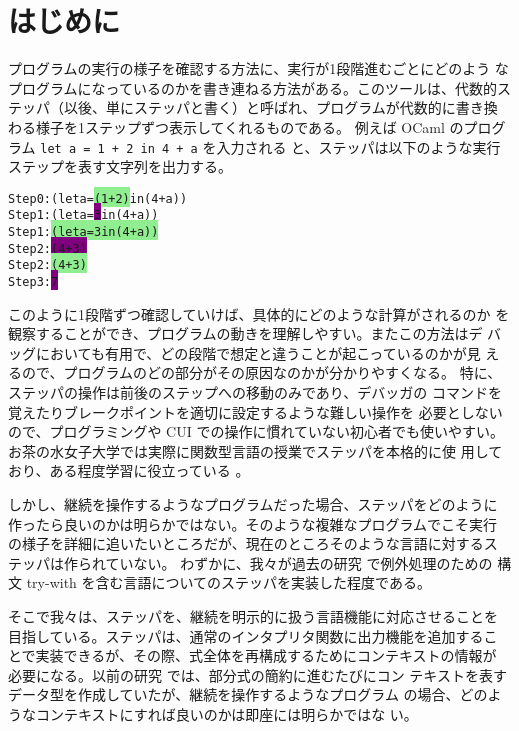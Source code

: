 \section{はじめに}

プログラムの実行の様子を確認する方法に、実行が1段階進むごとにどのよう
なプログラムになっているのかを書き連ねる方法がある。このツールは、代数的ス
テッパ（以後、単にステッパと書く）と呼ばれ、プログラムが代数的に書き換
わる様子を1ステップずつ表示してくれるものである。
例えば OCaml のプログラム \texttt{let a = 1 + 2 in 4 + a} を入力される
と、ステッパは以下のような実行ステップを表す文字列を出力する。

\vspace{-5pt}
\begin{spacing}{0.9}
\begin{alltt}
Step 0:  (let a = \colorbox{lightgreen}{(1 + 2)} in (4 + a))
Step 1:  (let a = \colorbox{purple}{3} in (4 + a))
Step 1:  \colorbox{lightgreen}{(let a = 3 in (4 + a))}
Step 2:  \colorbox{purple}{(4 + 3)}
Step 2:  \colorbox{lightgreen}{(4 + 3)}
Step 3:  \colorbox{purple}{7}
\end{alltt}
\end{spacing}
\vspace{-5pt}

このように1段階ずつ確認していけば、具体的にどのような計算がされるのか
を観察することができ、プログラムの動きを理解しやすい。またこの方法はデ
バッグにおいても有用で、どの段階で想定と違うことが起こっているのかが見
えるので、プログラムのどの部分がその原因なのかが分かりやすくなる。
特に、ステッパの操作は前後のステップへの移動のみであり、デバッガの
コマンドを覚えたりブレークポイントを適切に設定するような難しい操作を
必要としないので、プログラミングや CUI での操作に慣れていない初心者でも使いやすい。
お茶の水女子大学では実際に関数型言語の授業でステッパを本格的に使
用しており、ある程度学習に役立っている \cite{FCA19}。

しかし、継続を操作するようなプログラムだった場合、ステッパをどのように
作ったら良いのかは明らかではない。そのような複雑なプログラムでこそ実行
の様子を詳細に追いたいところだが、現在のところそのような言語に対するス
テッパは作られていない。
わずかに、我々が過去の研究 \cite{FCA19} で例外処理のための
構文 try-with を含む言語についてのステッパを実装した程度である。

そこで我々は、ステッパを、継続を明示的に扱う言語機能に対応させることを
目指している。ステッパは、通常のインタプリタ関数に出力機能を追加するこ
とで実装できるが、その際、式全体を再構成するためにコンテキストの情報が
必要になる。以前の研究 \cite{FCA19} では、部分式の簡約に進むたびにコン
テキストを表すデータ型を作成していたが、継続を操作するようなプログラム
の場合、どのようなコンテキストにすれば良いのかは即座には明らかではな
い。

